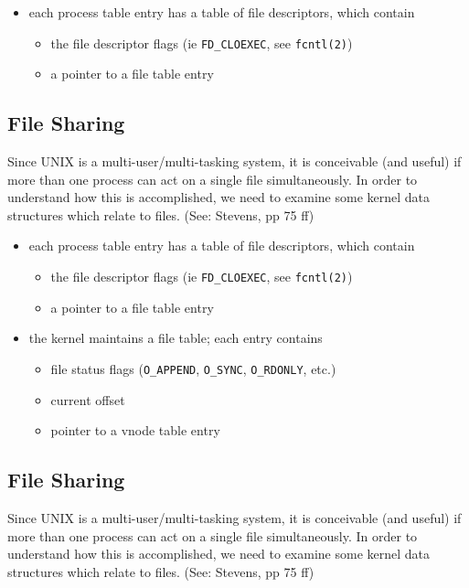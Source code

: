 \documentclass[xga]{xdvislides}
\begin{document}
\begin{itemize}
	\item each process table entry has a table of file descriptors, which contain
		\begin{itemize}
			\item the file descriptor flags (ie {\tt FD\_CLOEXEC}, see \verb+fcntl(2)+)
			\item a pointer to a file table entry
		\end{itemize}
\end{itemize}

\subsection{File Sharing}
Since UNIX is a multi-user/multi-tasking system, it is conceivable (and
useful) if more than one process can act on a single file simultaneously. In
order to understand how this is accomplished, we need to examine some kernel
data structures which relate to files.  (See: Stevens, pp 75 ff)

\begin{itemize}
	\item each process table entry has a table of file descriptors, which contain
		\begin{itemize}
			\item the file descriptor flags (ie {\tt FD\_CLOEXEC}, see \verb+fcntl(2)+)
			\item a pointer to a file table entry
		\end{itemize}
	\item the kernel maintains a file table;  each entry contains
		\begin{itemize}
			\item file status flags (\verb+O_APPEND+, \verb+O_SYNC+, \verb+O_RDONLY+, etc.)
			\item current offset
			\item pointer to a vnode table entry
		\end{itemize}
\end{itemize}

\subsection{File Sharing}
Since UNIX is a multi-user/multi-tasking system, it is conceivable (and useful)
if more than one process can act on a single file simultaneously. In
order to understand how this is accomplished, we need to examine some kernel
data structures which relate to files.  (See: Stevens, pp 75 ff)
\end{document}
